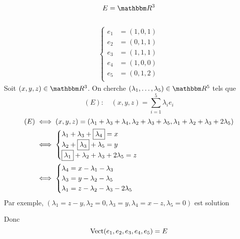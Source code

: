 \begin{exm}
	\[E = \R^3\] \\
	\begin{align*}
		\begin{cases}
		e_1 &= (1,0,1)\\
		e_2 &= (0,1,1)\\
		e_3 &= (1,1,1)\\
		e_4 &= (1,0,0)\\
		e_5 &= (0,1,2)\\
		\end{cases}
	\end{align*}
	Soit $(x,y,z) \in \R^3$. On cherche $(\lambda_1,\ldots,\lambda_5) \in \R^{5}$ tels que \[
		(E): \quad (x,y,z) = \sum_{i = 1}^{5}\lambda_ie_i
	\]
	\begin{align*}
		(E) &\iff (x,y,z) = (\lambda_1 + \lambda_3 + \lambda_4, \lambda_2 + \lambda_3 + \lambda_5, \lambda_1+\lambda_2 + \lambda_3 + 2\lambda_5)\\
				&\iff \begin{cases}
					\lambda_1 + \lambda_3 + \fbox{$\lambda_4$} = x\\
					\lambda_2 + \fbox{$\lambda_3$} + \lambda_5 = y\\
					\fbox{$\lambda_1$} + \lambda_2 + \lambda_3 + 2\lambda_5 = z	
				\end{cases}\\
				&\iff
				\begin{cases}
					\lambda_4 = x - \lambda_1 - \lambda_3\\
					\lambda_3 = y - \lambda_2 - \lambda_5\\
					\lambda_1 = z - \lambda_2 - \lambda_3 - 2\lambda_5
				\end{cases}
	\end{align*}
	Par exemple, $(\lambda_1 = z-y, \lambda_2=0, \lambda_3 = y, \lambda_4 = x-z,\lambda_5=0)$ est solution

	Donc \[
		\operatorname{Vect}(e_1,e_2,e_3,e_4,e_5) = E
	\] 
\end{exm}

